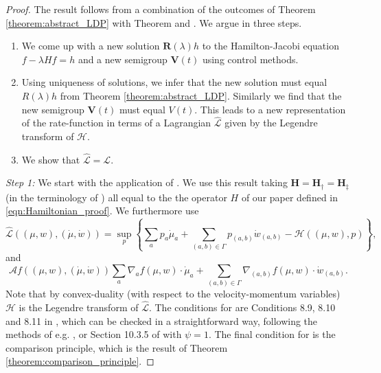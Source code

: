 \documentclass[a4paper]{article}
\newcommand{\cA}{\mathcal{A}}
\newcommand{\cH}{\mathcal{H}}
\newcommand{\cL}{\mathcal{L}}
\newcommand{\bfH}{\mathbf{H}}
\newcommand{\bfR}{\mathbf{R}}
\newcommand{\bfV}{\mathbf{V}}
\numberwithin{equation}{section}
\theoremstyle{definition}
\begin{document}
\begin{proof}
	The result follows from a combination of the outcomes of Theorem \ref{theorem:abstract_LDP} with Theorem \cite[Theorem 8.27]{FK06} and \cite[Theorem 8.14]{FK06}. We argue in three steps.
	
	\begin{enumerate}[(1)]
		\item We come up with a new solution $\bfR(\lambda)h$ to the Hamilton-Jacobi equation $f - \lambda Hf = h$ and a new semigroup $\bfV(t)$ using control methods.
		\item Using uniqueness of solutions, we infer that the new solution must equal $R(\lambda)h$ from Theorem \ref{theorem:abstract_LDP}. Similarly we find that the new semigroup $\bfV(t)$ must equal $V(t)$. This leads to a new representation of the rate-function in terms of a Lagrangian $\widehat{\cL}$ given by the Legendre transform of $\cH$.
		\item We show that $\widehat{\cL} = \cL$.
	\end{enumerate}
	
	\smallskip
	
	\textit{Step 1:} We start with the application of \cite[Theorem 8.27]{FK06}. We use this result taking $\bfH = \bfH_\dagger = \bfH_\ddagger$ (in the terminology of \cite{FK06}) all equal to the the operator $H$ of our paper defined in \eqref{eqn:Hamiltonian_proof}. We furthermore use
	\begin{equation} \label{eqn:Lagrangian_abstract}
		\widehat{\cL}((\mu,w),(\dot{\mu},\dot{w})) = \sup_{p} \left\{ \sum_a p_a \dot{\mu}_a + \sum_{(a,b) \in \Gamma} p_{(a,b)} \dot{w}_{(a,b)} - \cH((\mu,w),p) \right\},
	\end{equation}
	and
	\begin{equation*}
		\cA f((\mu,w),(\dot{\mu},\dot{w})) \sum_a \nabla_a f(\mu,w) \cdot \dot{\mu}_a + \sum_{(a,b) \in \Gamma} \nabla_{(a,b)}f(\mu,w) \cdot \dot{w}_{(a,b)}.
	\end{equation*}
	Note that by convex-duality (with respect to the velocity-momentum variables) $\cH$ is the Legendre transform of $\widehat{\cL}$. The conditions for  \cite[Theorem 8.27]{FK06} are Conditions 8.9, 8.10 and 8.11 in \cite{FK06}, which can be checked in a straightforward way, following the methods of e.g. \cite{Kr16b,CoKr17}, or Section 10.3.5 of \cite{FK06} with $\psi = 1$. The final condition for \cite[Theorem 8.27]{FK06} is the comparison principle, which is the result of Theorem \ref{theorem:comparison_principle}.
	

\end{proof}
\end{document}
